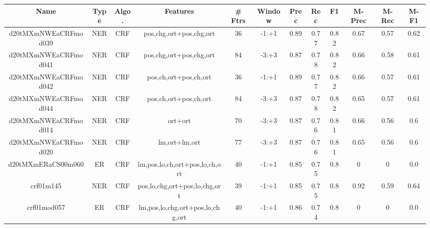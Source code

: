 \documentclass[a4paper]{article}
\begin{document}
\begin{landscape}
\begin{center}
\begin{tabular}{ |c|c|c|c|c|c|c|c|c|c|c|c|} 
 \hline
 	Name & Type & Algo. & Features & \# Ftrs & Window & Prec & Rec & F1 & M-Prec & M-Rec & M-F1\\
 \hline

 	

 
 	
 	\small{ d20tMXmNWEaCRFmod039 } & NER & CRF & pos,chg,ort+pos,chg,ort  &  36 &  -1:+1  &  0.89 & 0.77 & 0.82  &  0.67 & 0.57 & 0.62 \\
 	

 
 	
 	\small{ d20tMXmNWEaCRFmod041 } & NER & CRF & pos,chg,ort+pos,chg,ort  &  84 &  -3:+3  &  0.87 & 0.78 & 0.82  &  0.66 & 0.58 & 0.61 \\
 	

 
 	
 	\small{ d20tMXmNWEaCRFmod042 } & NER & CRF & pos,ch,ort+pos,ch,ort  &  36 &  -1:+1  &  0.89 & 0.77 & 0.82  &  0.66 & 0.57 & 0.61 \\
 	

 
 	
 	\small{ d20tMXmNWEaCRFmod044 } & NER & CRF & pos,ch,ort+pos,ch,ort  &  84 &  -3:+3  &  0.87 & 0.78 & 0.82  &  0.65 & 0.57 & 0.61 \\
 	

 
 	
 	\small{ d20tMXmNWEaCRFmod014 } & NER & CRF & ort+ort  &  70 &  -3:+3  &  0.87 & 0.76 & 0.81  &  0.66 & 0.56 & 0.6 \\
 	

 
 	
 	\small{ d20tMXmNWEaCRFmod020 } & NER & CRF & lm,ort+lm,ort  &  77 &  -3:+3  &  0.87 & 0.76 & 0.81  &  0.65 & 0.56 & 0.6 \\
 	

 
 	
 	\small{ d20tMXmERaCS00m060 } & ER & CRF & lm,pos,lo,ch,ort+pos,lo,ch,ort  &  40 &  -1:+1  &  0.85 & 0.75 & 0.8  &  0 & 0 & 0.0 \\
 	

 
 	
 	\small{ crf01m145 } & NER & CRF & pos,lo,chg,ort+pos,lo,chg,ort  &  39 &  -1:+1  &  0.85 & 0.75 & 0.8  &  0.92 & 0.59 & 0.64 \\
 	

 
 	
 	\small{ crf01mod057 } & ER & CRF & lm,pos,lo,chg,ort+pos,lo,chg,ort  &  40 &  -1:+1  &  0.86 & 0.74 & 0.8  &  0 & 0 & 0.0 \\
 	


\end{tabular}
\end{center}
\end{landscape}
\end{document}
